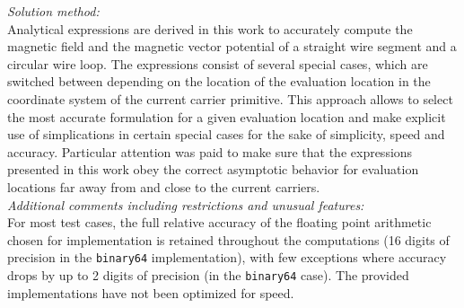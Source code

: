 \documentclass[preprint,12pt]{elsarticle}
\begin{document}
\begin{small}
{\em Solution method:}\\
  Analytical expressions are derived in this work to accurately compute
  the magnetic field and the magnetic vector potential of a straight wire segment
  and a circular wire loop. The expressions consist of several special cases,
  which are switched between depending on the location of the evaluation location
  in the coordinate system of the current carrier primitive.
  This approach allows to select the most accurate formulation
  for a given evaluation location and make explicit use of simplications
  in certain special cases for the sake of simplicity, speed and accuracy.
  Particular attention was paid to make sure that the expressions presented in this work
  obey the correct asymptotic behavior for evaluation locations
  far away from and close to the current carriers. \\
{\em Additional comments including restrictions and unusual features:}\\
  For most test cases, the full relative accuracy of the floating point
  arithmetic chosen for implementation is retained throughout the computations
  (16 digits of precision in the \texttt{binary64} implementation),
  with few exceptions where accuracy drops by up to 2 digits of precision
  (in the \texttt{binary64} case).
  The provided implementations have not been optimized for speed. \\
\end{small}








\appendix















\end{document}
